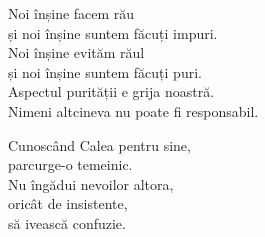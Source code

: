 Noi înșine facem rău\\
și noi înșine suntem făcuți impuri.\\
Noi înșine evităm răul\\
și noi înșine suntem făcuți puri.\\
Aspectul purității e grija noastră.\\
Nimeni altcineva nu poate fi responsabil.


Cunoscând Calea pentru sine,\\
parcurge-o temeinic.\\
Nu îngădui nevoilor altora,\\
oricât de insistente,\\
să ivească confuzie.
